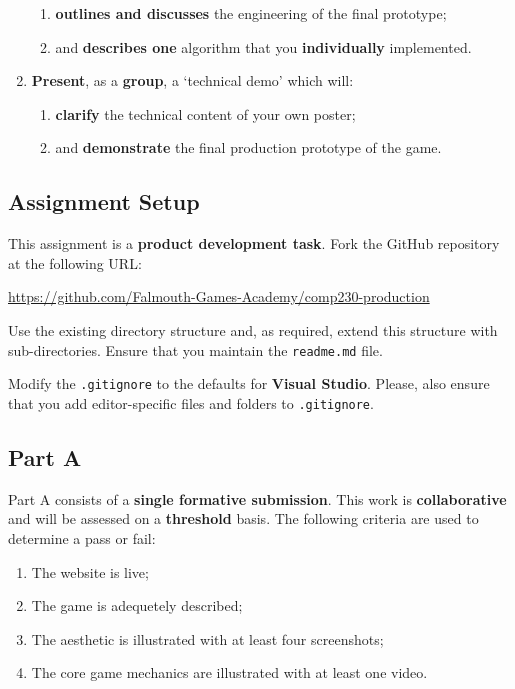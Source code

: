 \documentclass{../fal_assignment}
\begin{document}
\begin{enumerate}[label=(\Alph*)]
    	\begin{enumerate}[label=\roman*.]
    		\item \textbf{outlines and discusses} the engineering of the final prototype;
    		\item and \textbf{describes one} algorithm that you \textbf{individually} implemented. 
	\end{enumerate}
    \item \textbf{Present}, as a \textbf{group}, a `technical demo' which will:
    	\begin{enumerate}[label=\roman*.]
    		\item \textbf{clarify} the technical content of your own poster;
    		\item and \textbf{demonstrate} the final production prototype of the game.
	\end{enumerate}
\end{enumerate}
  
\subsection*{Assignment Setup}

This assignment is a \textbf{product development task}. Fork the GitHub repository at the following URL:

\indent \url{https://github.com/Falmouth-Games-Academy/comp230-production}

Use the existing directory structure and, as required, extend this structure with sub-directories. Ensure that you maintain the \texttt{readme.md} file.

Modify the \texttt{.gitignore} to the defaults for \textbf{Visual Studio}. Please, also ensure that you add editor-specific files and folders to \texttt{.gitignore}. 

\subsection*{Part A}

Part A consists of a \textbf{single formative submission}. This work is \textbf{collaborative} and will be assessed on a \textbf{threshold} basis. The following criteria are used to determine a pass or fail:

\begin{enumerate}[label=(\alph*)]
	\item The website is live;
	\item The game is adequetely described;
	\item The aesthetic is illustrated with at least four screenshots;
	\item The core game mechanics are illustrated with at least one video.
\end{enumerate}
\end{document}
